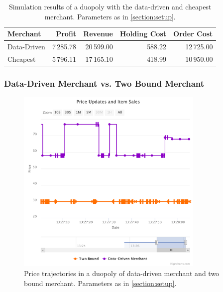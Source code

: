 \begin{table}[t]
	\centering
	\begin{tabular}{lrrrr}
		\toprule
		\textbf{Merchant} & \textbf{Profit} & \textbf{Revenue} & \textbf{Holding Cost} & \textbf{Order Cost} \\
		\midrule
		Data-Driven & 7\,285.78 & 20\,599.00 & 588.22 & 12\,725.00 \\
		Cheapest & 5\,796.11 & 17\,165.10 & 418.99 & 10\,950.00 \\
		\bottomrule
	\end{tabular}
	\caption[Simulation Results: Data-Driven Merchant versus Cheapest Merchant]{Simulation results of a duopoly with the data-driven and cheapest merchant. Parameters as in \cref{section:setup}.}
	\label{tab:duopoly_cheapest}
\end{table}

\subsubsection{Data-Driven Merchant vs. Two Bound Merchant}

\begin{figure}[t]
	\centering
	\includegraphics[width=0.8\textwidth]{figures/duopoly_bound_prices}
	\caption[Price Trajectories: Data-Driven Merchant versus Two Bound Merchant]{Price trajectories in a duopoly of data-driven merchant and two bound merchant. Parameters as in \cref{section:setup}.}
	\label{fig:duopoly_bound_prices}
\end{figure}

